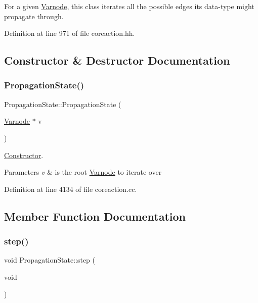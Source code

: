 For a given \mbox{\hyperlink{class_varnode}{Varnode}}, this class iterates all the possible edges its data-\/type might propagate through. 

Definition at line 971 of file coreaction.\+hh.



\subsection{Constructor \& Destructor Documentation}
\mbox{\label{class_propagation_state_a0d46f7392b5cc38c418e92429cde1a83}} 
\subsubsection{\texorpdfstring{PropagationState()}{PropagationState()}}
{\footnotesize\ttfamily Propagation\+State\+::\+Propagation\+State (\begin{DoxyParamCaption}\item[{\mbox{\hyperlink{class_varnode}{Varnode}} $\ast$}]{v }\end{DoxyParamCaption})}



\mbox{\hyperlink{class_constructor}{Constructor}}. 


\begin{DoxyParams}{Parameters}
{\em v} & is the root \mbox{\hyperlink{class_varnode}{Varnode}} to iterate over \\
\hline
\end{DoxyParams}


Definition at line 4134 of file coreaction.\+cc.



\subsection{Member Function Documentation}
\mbox{\label{class_propagation_state_a49ccacb0e834ad22fc157dc701f14b46}} 
\subsubsection{\texorpdfstring{step()}{step()}}
{\footnotesize\ttfamily void Propagation\+State\+::step (\begin{DoxyParamCaption}\item[{void}]{ }\end{DoxyParamCaption})}



